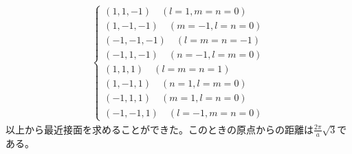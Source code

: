 \documentclass[a4paper,11pt,dvipdfmx]{jsarticle}
\begin{document}
\begin{enumerate}
    \begin{align*}
      \begin{cases}
        (1, 1, -1) \quad (l = 1, m = n = 0) \\
        (1, -1, -1) \quad (m = -1, l = n = 0) \\
        (-1, -1, -1) \quad (l = m = n = -1) \\
        (-1, 1, -1) \quad (n = -1, l = m = 0) \\
        (1, 1, 1) \quad (l = m = n = 1) \\
        (1, -1, 1) \quad (n = 1, l = m = 0) \\
        (-1, 1, 1) \quad (m = 1, l = n = 0) \\
        (-1, -1, 1) \quad (l = -1, m = n = 0) 
      \end{cases}
    \end{align*}
    以上から最近接面を求めることができた。このときの原点からの距離は$\displaystyle \frac{2\pi}{a} \sqrt{3}$である。
    

\end{enumerate}
\end{document}
